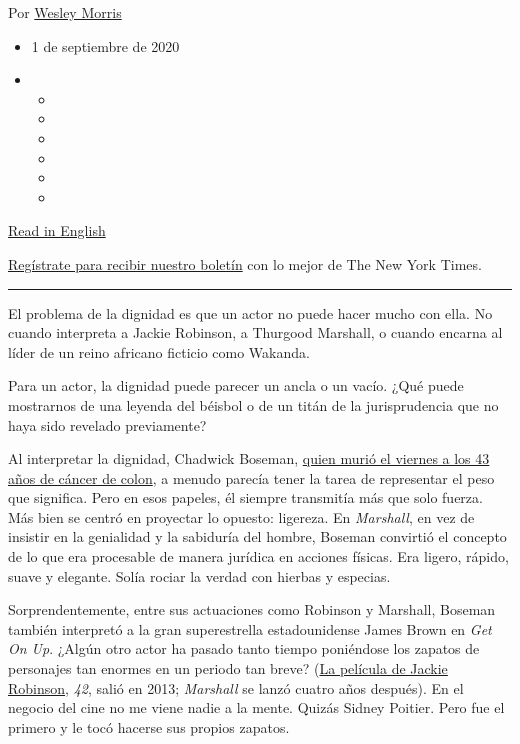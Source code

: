 Por \href{https://www.nytimes3xbfgragh.onion/by/wesley-morris}{Wesley
Morris}

\begin{itemize}
\item
  1 de septiembre de 2020
\item
  \begin{itemize}
  \item
  \item
  \item
  \item
  \item
  \item
  \end{itemize}
\end{itemize}

\href{https://www.nytimes3xbfgragh.onion/2020/08/29/movies/chadwick-boseman-appraisal.html}{Read
in English}

\href{https://www.nytimes3xbfgragh.onion/newsletters/el-times}{Regístrate
para recibir nuestro boletín} con lo mejor de The New York Times.

\begin{center}\rule{0.5\linewidth}{\linethickness}\end{center}

El problema de la dignidad es que un actor no puede hacer mucho con
ella. No cuando interpreta a Jackie Robinson, a Thurgood Marshall, o
cuando encarna al líder de un reino africano ficticio como Wakanda.

Para un actor, la dignidad puede parecer un ancla o un vacío. ¿Qué puede
mostrarnos de una leyenda del béisbol o de un titán de la jurisprudencia
que no haya sido revelado previamente?

Al interpretar la dignidad, Chadwick Boseman,
\href{https://www.nytimes3xbfgragh.onion/2020/08/28/movies/chadwick-boseman-dead.html}{quien
murió el viernes a los 43 años de cáncer de colon}, a menudo parecía
tener la tarea de representar el peso que significa. Pero en esos
papeles, él siempre transmitía más que solo fuerza. Más bien se centró
en proyectar lo opuesto: ligereza. En \emph{Marshall}, en vez de
insistir en la genialidad y la sabiduría del hombre, Boseman convirtió
el concepto de lo que era procesable de manera jurídica en acciones
físicas. Era ligero, rápido, suave y elegante. Solía rociar la verdad
con hierbas y especias.

Sorprendentemente, entre sus actuaciones como Robinson y Marshall,
Boseman también interpretó a la gran superestrella estadounidense James
Brown en \emph{Get On Up}. ¿Algún otro actor ha pasado tanto tiempo
poniéndose los zapatos de personajes tan enormes en un periodo tan
breve?
(\href{https://www.nytimes3xbfgragh.onion/2013/04/12/movies/42-with-chadwick-boseman-as-jackie-robinson.html}{La
película de Jackie Robinson}, \emph{42}, salió en 2013; \emph{Marshall}
se lanzó cuatro años después). En el negocio del cine no me viene nadie
a la mente. Quizás Sidney Poitier. Pero fue el primero y le tocó hacerse
sus propios zapatos.

